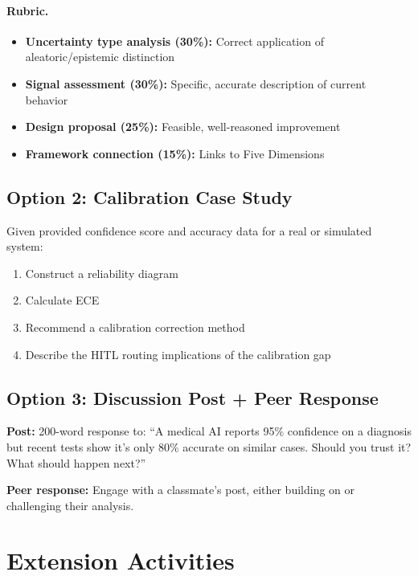 \paragraph{Rubric.}
\begin{itemize}
    \item \textbf{Uncertainty type analysis (30\%):} Correct application of aleatoric/epistemic distinction
    \item \textbf{Signal assessment (30\%):} Specific, accurate description of current behavior
    \item \textbf{Design proposal (25\%):} Feasible, well-reasoned improvement
    \item \textbf{Framework connection (15\%):} Links to Five Dimensions
\end{itemize}

\subsection{Option 2: Calibration Case Study}

Given provided confidence score and accuracy data for a real or simulated system:
\begin{enumerate}
    \item Construct a reliability diagram
    \item Calculate ECE
    \item Recommend a calibration correction method
    \item Describe the HITL routing implications of the calibration gap
\end{enumerate}

\subsection{Option 3: Discussion Post + Peer Response}

\textbf{Post:} 200-word response to: ``A medical AI reports 95\% confidence on a diagnosis but recent tests show it's only 80\% accurate on similar cases. Should you trust it? What should happen next?''

\textbf{Peer response:} Engage with a classmate's post, either building on or challenging their analysis.

\section{Extension Activities}

